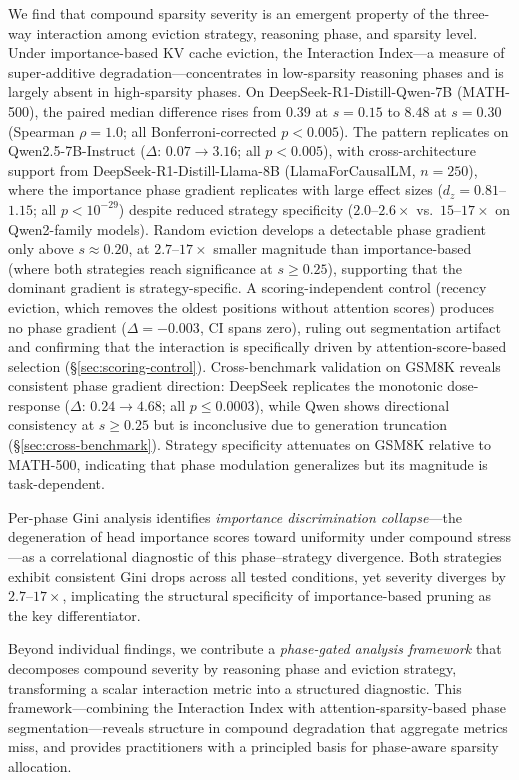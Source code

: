 We find that compound sparsity severity is an emergent property of the three-way interaction among eviction strategy, reasoning phase, and sparsity level.
Under importance-based KV cache eviction, the Interaction Index---a measure of super-additive degradation---concentrates in low-sparsity reasoning phases and is largely absent in high-sparsity phases.
On DeepSeek-R1-Distill-Qwen-7B (MATH-500), the paired median difference rises from $0.39$ at $s{=}0.15$ to $8.48$ at $s{=}0.30$ (Spearman $\rho{=}1.0$; all Bonferroni-corrected $p < 0.005$).
The pattern replicates on Qwen2.5-7B-Instruct ($\Delta$: $0.07 \to 3.16$; all $p < 0.005$), with cross-architecture support from DeepSeek-R1-Distill-Llama-8B (LlamaForCausalLM, $n{=}250$), where the importance phase gradient replicates with large effect sizes ($d_z{=}0.81$--$1.15$; all $p < 10^{-29}$) despite reduced strategy specificity ($2.0$--$2.6{\times}$ vs.\ $15$--$17{\times}$ on Qwen2-family models).
Random eviction develops a detectable phase gradient only above $s \approx 0.20$, at $2.7$--$17{\times}$ smaller magnitude than importance-based (where both strategies reach significance at $s \geq 0.25$), supporting that the dominant gradient is strategy-specific.
A scoring-independent control (recency eviction, which removes the oldest positions without attention scores) produces no phase gradient ($\Delta{=}-0.003$, CI spans zero), ruling out segmentation artifact and confirming that the interaction is specifically driven by attention-score-based selection (\S\ref{sec:scoring-control}).
Cross-benchmark validation on GSM8K reveals consistent phase gradient direction: DeepSeek replicates the monotonic dose-response ($\Delta$: $0.24 \to 4.68$; all $p \leq 0.0003$), while Qwen shows directional consistency at $s \geq 0.25$ but is inconclusive due to generation truncation (\S\ref{sec:cross-benchmark}). Strategy specificity attenuates on GSM8K relative to MATH-500, indicating that phase modulation generalizes but its magnitude is task-dependent.

Per-phase Gini analysis identifies \emph{importance discrimination collapse}---the degeneration of head importance scores toward uniformity under compound stress---as a correlational diagnostic of this phase--strategy divergence. Both strategies exhibit consistent Gini drops across all tested conditions, yet severity diverges by $2.7$--$17{\times}$, implicating the structural specificity of importance-based pruning as the key differentiator.

Beyond individual findings, we contribute a \emph{phase-gated analysis framework} that decomposes compound severity by reasoning phase and eviction strategy, transforming a scalar interaction metric into a structured diagnostic. This framework---combining the Interaction Index with attention-sparsity-based phase segmentation---reveals structure in compound degradation that aggregate metrics miss, and provides practitioners with a principled basis for phase-aware sparsity allocation.

